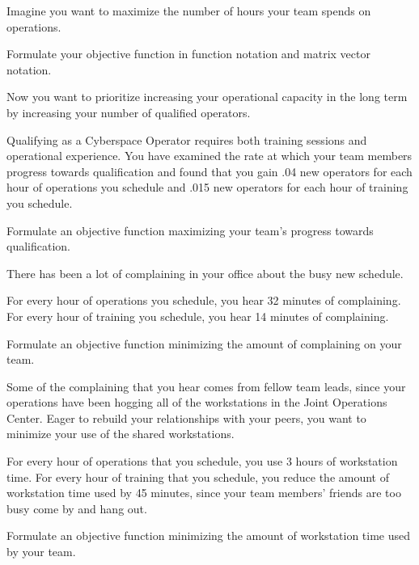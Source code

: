 \documentclass[11pt]{article}
\begin{document}


\leavevmode\hspace*{\parindent}Imagine you want to maximize the number of hours your team spends on operations. 

Formulate your objective function in function notation and matrix vector notation. 

\vfill

Now you want to prioritize increasing your operational capacity in the long term by increasing your number of qualified operators. 

Qualifying as a Cyberspace Operator requires both training sessions and operational experience. 
You have examined the rate at which your team members progress towards qualification and found that you gain .04 new operators for each hour of operations you schedule and .015 new operators for each hour of training you schedule. 

Formulate an objective function maximizing your team's progress towards qualification.

\vfill


\leavevmode\hspace*{\parindent}There has been a lot of complaining in your office about the busy new schedule. 

For every hour of operations you schedule, you hear 32 minutes of complaining. 
For every hour of training you schedule, you hear 14 minutes of complaining. 

Formulate an objective function minimizing the amount of complaining on your team.

\vfill

Some of the complaining that you hear comes from fellow team leads, since your operations have been hogging all of the workstations in the Joint Operations Center. 
Eager to rebuild your relationships with your peers, you want to minimize your use of the shared workstations. 

For every hour of operations that you schedule, you use 3 hours of workstation time. 
For every hour of training that you schedule, you reduce the amount of workstation time used by 45 minutes, since your team members' friends are too busy come by and hang out. 

Formulate an objective function minimizing the amount of workstation time used by your team.
\end{document}
